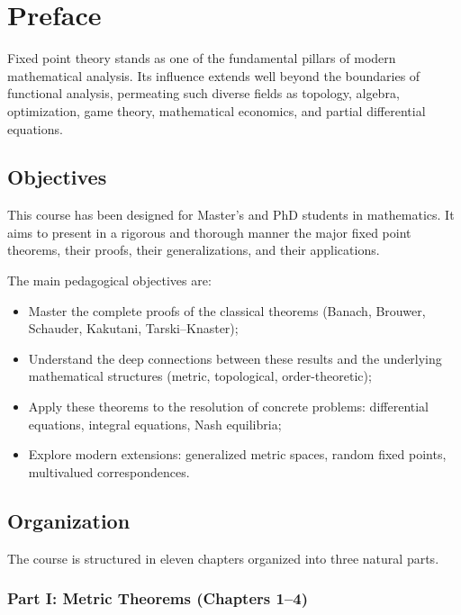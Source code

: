 \chapter*{Preface}

Fixed point theory stands as one of the fundamental pillars of modern
mathematical analysis. Its influence extends well beyond the boundaries of
functional analysis, permeating such diverse fields as topology, algebra,
optimization, game theory, mathematical economics, and partial differential
equations.

\section*{Objectives}

This course has been designed for Master's and PhD students in mathematics.
It aims to present in a rigorous and thorough manner the major fixed point
theorems, their proofs, their generalizations, and their applications.

The main pedagogical objectives are:
\begin{itemize}
    \item Master the complete proofs of the classical theorems (Banach, Brouwer,
          Schauder, Kakutani, Tarski--Knaster);
    \item Understand the deep connections between these results and the underlying
          mathematical structures (metric, topological, order-theoretic);
    \item Apply these theorems to the resolution of concrete problems:
          differential equations, integral equations, Nash equilibria;
    \item Explore modern extensions: generalized metric spaces, random fixed
          points, multivalued correspondences.
\end{itemize}

\section*{Organization}

The course is structured in eleven chapters organized into three natural parts.

\subsection*{Part I: Metric Theorems (Chapters 1--4)}

